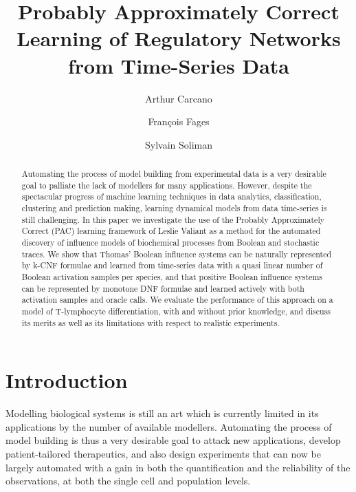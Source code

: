 \documentclass{llncs}
\begin{document}
\title{Probably Approximately Correct Learning of Regulatory Networks from Time-Series Data}

\author{Arthur Carcano \and Fran\c{c}ois Fages \and Sylvain
Soliman}


\maketitle

\begin{abstract}
Automating the process of model building from experimental data 
is a very desirable goal to palliate the lack of modellers for many applications.
However, despite the spectacular progress of machine learning techniques in data analytics, classification, clustering and prediction making,
learning dynamical models from data time-series is still challenging.
In this paper we investigate the use of the Probably Approximately Correct (PAC) learning 
framework of Leslie Valiant as a method for the automated discovery of influence models of biochemical processes from Boolean and stochastic traces. 
We show that Thomas' Boolean influence systems can be naturally represented by k-CNF formulae
and learned
from time-series data with a quasi linear number of Boolean activation samples per species,
and that positive Boolean influence systems can be represented by monotone DNF formulae
and learned actively with both activation samples and oracle calls.
We evaluate the performance of this approach on a model of T-lymphocyte
differentiation, with and without prior knowledge,
and discuss its merits as well as its limitations with respect to realistic experiments.
\end{abstract}

\section{Introduction}

Modelling biological systems is still an art which is currently limited in its applications by the number of available modellers.
Automating the process of model building is thus a very desirable goal
to attack new applications, develop patient-tailored therapeutics,
and also design experiments that can now be largely automated
with a gain in both the quantification and the reliability of the observations, at both the single cell and population levels.
\end{document}
